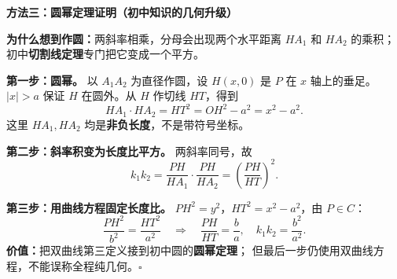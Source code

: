 \clearpage
\begin{proofbox}
\textbf{\textcolor{CProof}{方法三：圆幂定理证明（初中知识的几何升级）}}
\begin{center}\end{center}
\textbf{为什么想到作圆：}两斜率相乘，分母会出现两个水平距离
$HA_1$ 和 $HA_2$ 的乘积；初中\textbf{切割线定理}专门把它变成一个平方。

\textbf{第一步：圆幂。}
以 $A_1A_2$ 为直径作圆，设 $H(x,0)$ 是 $P$ 在 $x$ 轴上的垂足。
$|x|>a$ 保证 $H$ 在圆外。从 $H$ 作切线 $HT$，得到
\[
 HA_1\cdot HA_2=HT^2=OH^2-a^2=x^2-a^2.
\]
这里 $HA_1,HA_2$ 均是\textbf{非负长度}，不是带符号坐标。

\textbf{第二步：斜率积变为长度比平方。}
两斜率同号，故
\[
 k_1k_2=\frac{PH}{HA_1}\cdot\frac{PH}{HA_2}
 =\boxed{\left(\frac{PH}{HT}\right)^2}.
\]

\textbf{第三步：用曲线方程固定长度比。}
$PH^2=y^2$，$HT^2=x^2-a^2$，由 $P\in C$：
\[
 \frac{PH^2}{b^2}=\frac{HT^2}{a^2}
 \quad\Longrightarrow\quad \frac{PH}{HT}=\frac ba,
 \quad\boxed{k_1k_2=\frac{b^2}{a^2}}.
\]
\textbf{价值：}把双曲线第三定义接到初中圆的\textbf{圆幂定理}；
但最后一步仍使用双曲线方程，不能误称全程纯几何。\quad\(\square\)
\end{proofbox}

